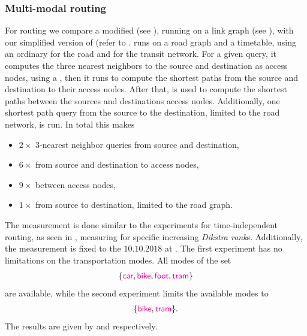 \subsubsection{Multi-modal routing}
	For \multiModal routing we compare a modified \dijkstra (see ), running on a link graph (see ), with
	our simplified version of \anr (refer to . \anr runs on a road graph and a timetable, using an ordinary \dijkstra for the road
	and \csa for the transit network. For a given query, it computes the three nearest neighbors to the source and destination as access nodes,
	using a \coverTree, then it runs \dijkstra to compute the shortest paths from the source and destination to their access nodes. After that, \csa is
	used to compute the shortest paths between the sources and destinations access nodes. Additionally, one shortest path query from the source
	to the destination, limited to the road network, is run. In total this makes
	\begin{itemize}
		\item[] $2 \times$ $3$-nearest neighbor queries from source and destination,
		\item[] $6 \times$ \dijkstra from source and destination to access nodes,
		\item[] $9 \times$ \csa between access nodes,
		\item[] $1 \times$ \dijkstra from source to destination, limited to the road graph.
	\end{itemize}
	The measurement is done similar to the experiments for \uniModal time-independent routing, as seen
	in , measuring for specific increasing \textit{Dikstra rank}s. Additionally, the measurement is fixed
	to the $10.10.2018$ at . The first experiment has no limitations on the transportation modes. All modes of the set
	\begin{align*}
		\{\textcolor{magenta}{\textsf{car}}, \textcolor{magenta}{\textsf{bike}}, \textcolor{magenta}{\textsf{foot}}, \textcolor{magenta}{\textsf{tram}}\}
	\end{align*}
	are available, while the second experiment limits the available modes to
	\begin{align*}
		\{\textcolor{magenta}{\textsf{bike}}, \textcolor{magenta}{\textsf{tram}}\}.
	\end{align*}
	The results are given by  and  respectively.\\
